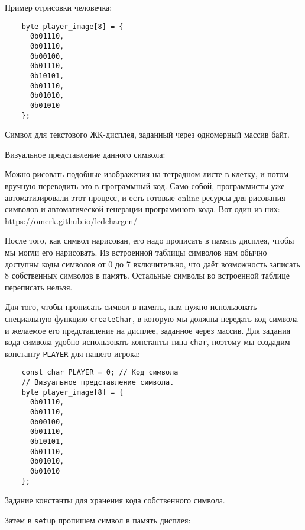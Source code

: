 \documentclass[../sparc.tex]{subfiles}
\begin{document}
Пример отрисовки человечка:

\begin{listing}[H]
  \begin{verbatim}
    byte player_image[8] = {
      0b01110,
      0b01110,
      0b00100,
      0b01110,
      0b10101,
      0b01110,
      0b01010,
      0b01010
    };
  \end{verbatim}
  \caption{Символ для текстового ЖК-дисплея, заданный через одномерный массив
    байт.}
  \label{listing:game-dev-lcd-custom-char}
\end{listing}

Визуальное представление данного символа:


Можно рисовать подобные изображения на тетрадном листе в клетку, и потом вручную
переводить это в программный код.  Само собой, программисты уже автоматизировали
этот процесс, и есть готовые online-ресурсы для рисования символов и
автоматической генерации программного кода.  Вот один из них:
\url{https://omerk.github.io/lcdchargen/}

После того, как символ нарисован, его надо прописать в память дисплея, чтобы мы
могли его нарисовать.  Из встроенной таблицы символов нам обычно доступны коды
символов от 0 до 7 включительно, что даёт возможность записать 8 собственных
символов в память.  Остальные символы во встроенной таблице переписать нельзя.

Для того, чтобы прописать символ в память, нам нужно использовать специальную
функцию \texttt{createChar}, в которую мы должны передать код символа и желаемое
его представление на дисплее, заданное через массив.  Для задания кода символа
удобно использовать константы типа \texttt{char}, поэтому мы создадим константу
\texttt{PLAYER} для нашего игрока:

\begin{listing}[H]
  \begin{verbatim}
    const char PLAYER = 0; // Код символа
    // Визуальное представление символа.
    byte player_image[8] = {
      0b01110,
      0b01110,
      0b00100,
      0b01110,
      0b10101,
      0b01110,
      0b01010,
      0b01010
    };
  \end{verbatim}
  \caption{Задание константы для хранения кода собственного символа.}
  \label{listing:game-dev-lcd-custom-char-const}
\end{listing}

Затем в \texttt{setup} пропишем символ в память дисплея:
\end{document}
